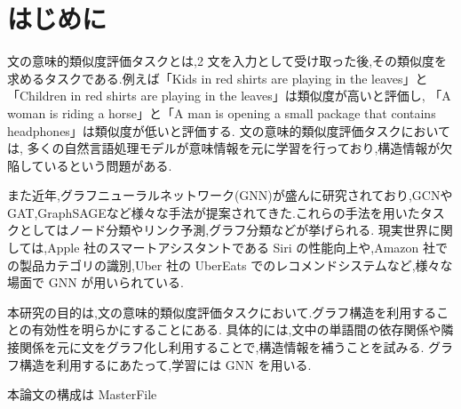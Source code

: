\documentclass[a4j,12pt]{thesis} %
\begin{document}
\newcommand{\ctext}[1]{\raise0.2ex\hbox{\textcircled{\scriptsize{#1}}}}
\setlength{\baselineskip}{1.95zw}
\setlength{\textheight}{30\baselineskip}
\mainmatter

\fi
\renewcommand\thefootnote{\arabic{footnote}}



\chapter{はじめに}\label{intro}
文の意味的類似度評価タスクとは,2 文を入力として受け取った後,その類似度を求めるタスクである.例えば「Kids in red shirts are playing in the leaves」と「Children in red shirts are playing in the leaves」は類似度が高いと評価し,
「A woman is riding a horse」と「A man is opening a small package that contains headphones」は類似度が低いと評価する.
文の意味的類似度評価タスクにおいては,
多くの自然言語処理モデルが意味情報を元に学習を行っており,構造情報が欠陥しているという問題がある.
\par また近年,グラフニューラルネットワーク(GNN)が盛んに研究されており,GCN\cite{kipf2017semi}や GAT\cite{velickovic2018graph},GraphSAGE\cite{hamilton2017inductive}など様々な手法が提案されてきた.これらの手法を用いたタスクとしてはノード分類やリンク予測,グラフ分類などが挙げられる.
現実世界に関しては,Apple 社のスマートアシスタントである Siri の性能向上や,Amazon 社での製品カテゴリの識別,Uber 社の UberEats でのレコメンドシステムなど,様々な場面で GNN が用いられている.
\par 本研究の目的は,文の意味的類似度評価タスクにおいて.グラフ構造を利用することの有効性を明らかにすることにある.
具体的には,文中の単語間の依存関係や隣接関係を元に文をグラフ化し利用することで,構造情報を補うことを試みる.
グラフ構造を利用するにあたって,学習には GNN を用いる.
\par 本論文の構成は
\expandafter\ifx\csname MasterFile\endcsname\relax
\def\MasterFile{本原稿です}

% 
% 

% 

\end{document}
